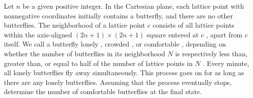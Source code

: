 Let 
$n$
 be a given positive integer. In the Cartesian plane, each lattice point with nonnegative coordinates initially contains a butterfly, and there are no other butterflies. The 
neighborhood
 of a lattice point 
$c$
 consists of all lattice points within the axis-aligned 
$(2n+1) \times (2n+1)$
 square entered at 
$c$
,
 apart from 
$c$
 itself. We call a butterfly 
lonely
, 
crowded
, or 
comfortable
, depending on whether the number of butterflies in its neighborhood 
$N$
 is respectively less than, greater than, or equal to half of the number of lattice points in 
$N$
.
 Every minute, all lonely butterflies fly away simultaneously. This process goes on for as long as there are any lonely butterflies. Assuming that the process eventually stops, determine the number of comfortable butterflies at the final state.
